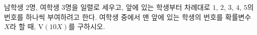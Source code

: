 남학생 $2$명, 여학생 $3$명을 일렬로 세우고, 앞에 있는 학생부터 차례대로 $1$, $2$, $3$, $4$, $5$의 번호를 하나씩 부여하려고 한다. 여학생 중에서 맨 앞에 있는 학생의 번호를 확률변수 $X$라 할 때, $\mathrm{V}(10X)$를 구하시오.
